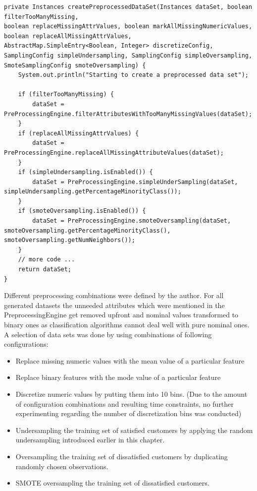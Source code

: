 \begin{lstlisting}[caption={DataSetCreator}, label={lst:dataSetCreator}]
private Instances createPreprocessedDataSet(Instances dataSet, boolean filterTooManyMissing,
boolean replaceMissingAttrValues, boolean markAllMissingNumericValues,
boolean replaceAllMissingAttrValues,
AbstractMap.SimpleEntry<Boolean, Integer> discretizeConfig,
SamplingConfig simpleUndersampling, SamplingConfig simpleOversampling,
SmoteSamplingConfig smoteOversampling) {
	System.out.println("Starting to create a preprocessed data set");
	
	if (filterTooManyMissing) {
		dataSet = PreProcessingEngine.filterAttributesWithTooManyMissingValues(dataSet);
	}
	if (replaceAllMissingAttrValues) {
		dataSet = PreProcessingEngine.replaceAllMissingAttributeValues(dataSet);
	}
	if (simpleUndersampling.isEnabled()) {
		dataSet = PreProcessingEngine.simpleUnderSampling(dataSet, simpleUndersampling.getPercentageMinorityClass());
	}
	if (smoteOversampling.isEnabled()) {
		dataSet = PreProcessingEngine.smoteOversampling(dataSet, smoteOversampling.getPercentageMinorityClass(), smoteOversampling.getNumNeighbors());
	}
	// more code ...
	return dataSet;
}
\end{lstlisting}

Different preprocessing combinations were defined by the author. For all generated datasets the unneeded attributes which were mentioned in the PreprocessingEngine get removed upfront and nominal values transformed to binary ones as classification algorithms cannot deal well with pure nominal ones. A selection of data sets was done by using combinations of following configurations:

\begin{itemize}
	\item Replace missing numeric values with the mean value of a particular feature 
	\item Replace binary features with the mode value of a particular feature
	\item Discretize numeric values by putting them into 10 bins. (Due to the amount of configuration combinations and resulting time constraints, no further experimenting regarding the number of discretization bins was conducted)
	\item Undersampling the training set of satisfied customers by applying the random undersampling introduced earlier in this chapter.
	\item Oversampling the training set of dissatisfied customers by duplicating randomly chosen observations.
	\item SMOTE oversampling the training set of dissatisfied customers.
\end{itemize}

